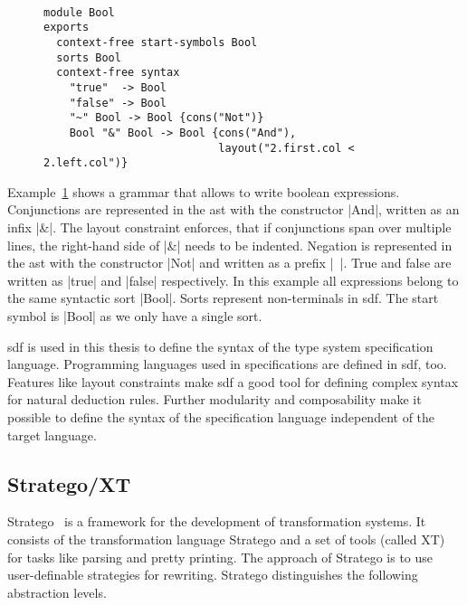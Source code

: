\begin{figure}
\begin{example}{~}
\begin{lstlisting}[language=sdf]
module Bool
exports
  context-free start-symbols Bool
  sorts Bool
  context-free syntax
    "true"  -> Bool
    "false" -> Bool
    "~" Bool -> Bool {cons("Not")}
    Bool "&" Bool -> Bool {cons("And"),
                           layout("2.first.col < 2.left.col")}
\end{lstlisting}
\label{ex:sdf-grammar}
\end{example}
\end{figure}

Example~\ref{ex:sdf-grammar} shows a grammar that allows to write
boolean expressions. Conjunctions are represented in the \gls{ast}
with the constructor \code|And|, written as an infix \code|&|. The
layout constraint enforces, that if conjunctions span over multiple
lines, the right-hand side of \code|&| needs to be indented. Negation
is represented in the \gls{ast} with the constructor \code|Not| and
written as a prefix \code|~|. True and false are written as
\code|true| and \code|false| respectively. In this example all
expressions belong to the same syntactic sort \code|Bool|. Sorts
represent non-terminals in \gls{sdf}. The start symbol is \code|Bool|
as we only have a single sort.

\gls{sdf} is used in this thesis to define the syntax of the type
system specification language. Programming languages used in
specifications are defined in \gls{sdf}, too. Features like layout
constraints make \gls{sdf} a good tool for defining complex syntax for
natural deduction rules. Further modularity and composability make it
possible to define the syntax of the specification language
independent of the target language.

\subsection{Stratego/XT}
Stratego~\cite{Visser01} is a framework for the development of
transformation systems. It consists of the transformation language
Stratego and a set of tools (called XT) for tasks like parsing and
pretty printing. The approach of Stratego is to use user-definable
strategies for rewriting. Stratego distinguishes the following
abstraction levels.


